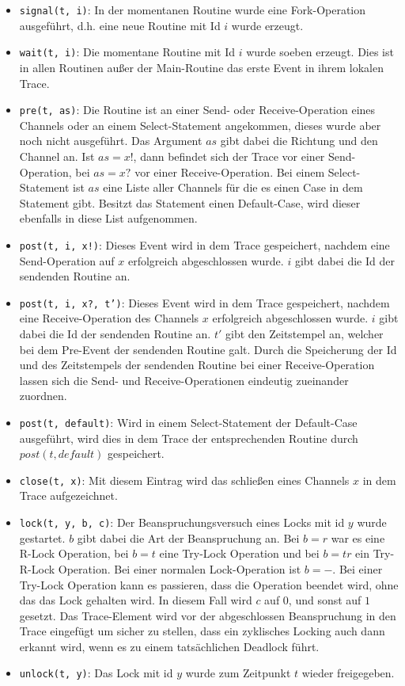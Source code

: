 \begin{itemize}
  \item \texttt{signal(t, i)}: In der momentanen Routine wurde
    eine Fork-Operation ausgeführt,
    d.h. eine neue Routine mit Id $i$ wurde erzeugt.
  \item \texttt{wait(t, i)}: Die momentane Routine mit Id $i$ wurde soeben erzeugt. Dies ist 
    in allen Routinen außer der Main-Routine das erste Event in ihrem lokalen Trace.
  \item \texttt{pre(t, as)}: Die Routine ist an einer Send- oder Receive-Operation eines 
    Channels oder an einem Select-Statement angekommen, dieses wurde aber noch nicht 
    ausgeführt. Das Argument $as$ gibt dabei die Richtung und den Channel an. 
    Ist $as = x!$, dann befindet sich der Trace vor einer Send-Operation, bei 
    $as = x?$ vor einer Receive-Operation. Bei einem Select-Statement ist 
    $as$ eine Liste aller Channels für die es einen 
    Case in dem Statement gibt. Besitzt das Statement einen Default-Case, wird
    dieser ebenfalls in diese List aufgenommen.
  \item \texttt{post(t, i, x!)}: Dieses Event wird in dem Trace gespeichert, nachdem 
    eine Send-Operation auf $x$ erfolgreich abgeschlossen wurde. 
    $i$ gibt dabei die Id der sendenden Routine an.
  \item \texttt{post(t, i, x?, t')}: Dieses Event wird in dem Trace gespeichert, nachdem 
    eine Receive-Operation des Channels $x$ erfolgreich abgeschlossen wurde. 
    $i$ gibt dabei die Id der sendenden Routine an. $t'$ gibt den Zeitstempel an,
    welcher bei dem Pre-Event der sendenden Routine galt. Durch die Speicherung der Id und des 
    Zeitstempels der sendenden Routine bei einer Receive-Operation lassen sich 
    die Send- und Receive-Operationen eindeutig zueinander zuordnen.
  \item \texttt{post(t, default)}: Wird in einem Select-Statement der Default-Case ausgeführt,
    wird dies in dem Trace der entsprechenden Routine durch $post(t, default)$ 
    gespeichert.
  \item \texttt{close(t, x)}: Mit diesem Eintrag wird das schließen eines Channels $x$ 
    in dem Trace aufgezeichnet.
  \item \texttt{lock(t, y, b, c)}: Der Beanspruchungsversuch eines Locks mit id $y$ wurde gestartet. 
    $b$ gibt dabei die Art der Beanspruchung an. Bei $b = r$ war es eine R-Lock
    Operation, bei $b = t$ eine Try-Lock Operation und bei $b = tr$ ein Try-R-Lock
    Operation. Bei einer normalen Lock-Operation ist $b = -$. Bei einer 
    Try-Lock Operation kann es passieren, dass die Operation beendet wird, 
    ohne das das Lock gehalten wird. In diesem Fall wird $c$ auf $0$, und 
    sonst auf $1$ gesetzt. Das Trace-Element wird vor der abgeschlossen 
    Beanspruchung in den Trace eingefügt um sicher zu stellen, dass 
    ein zyklisches Locking auch dann erkannt wird, wenn es zu einem 
    tatsächlichen Deadlock führt. 
  \item \texttt{unlock(t, y)}: Das Lock mit id $y$ wurde zum Zeitpunkt 
    $t$ wieder freigegeben. 
\end{itemize}



